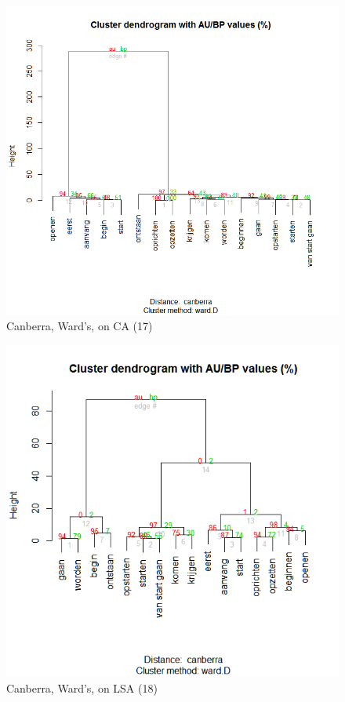\begin{figure}
\includegraphics[height=.3\textheight]{figures/Vandevoorde2-img46.png}
\caption{\label{fig:key:46}  Canberra, Ward’s, on CA (17)}
\end{figure}

\begin{figure}
\includegraphics[height=.3\textheight]{figures/Vandevoorde2-img47.png}
\caption{\label{fig:key:47}  Canberra, Ward’s, on LSA (18)}
\end{figure}


